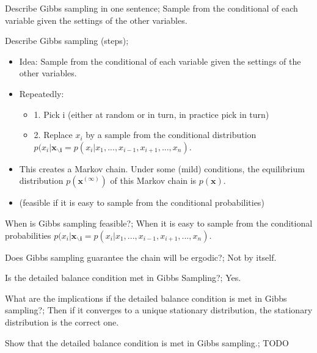\documentclass{article}
\begin{document}
Describe Gibbs sampling in one sentence; Sample from the conditional of each variable given the settings of the other variables.

Describe Gibbs sampling (steps); \begin{itemize}
    \item Idea: Sample from the conditional of each variable given the settings of the other variables.
    \item Repeatedly: \begin{itemize}
        \item 1. Pick i (either at random or in turn, in practice pick in turn)
        \item 2. Replace $x_i$ by a sample from the conditional distribution $p(x_i|\mathbf{x_{\backslash i}} = p(x_i | x_1, ..., x_{i-1}, x_{i+1}, ..., x_n)$.
    \end{itemize}
    \item This creates a Markov chain. Under some (mild) conditions, the equilibrium distribution $p(\mathbf{x}^(\infty))$ of this Markov chain is $p(\mathbf{x})$.
    \item (feasible if it is easy to sample from the conditional probabilities)
\end{itemize}

When is Gibbs sampling feasible?; When it is easy to sample from the conditional probabilities $p(x_i|\mathbf{x_{\backslash i}} = p(x_i | x_1, ..., x_{i-1}, x_{i+1}, ..., x_n)$.

Does Gibbs sampling guarantee the chain will be ergodic?; Not by itself.

Is the detailed balance condition met in Gibbs Sampling?; Yes.

What are the implications if the detailed balance condition is met in Gibbs sampling?; Then if it converges to a unique stationary distribution, the stationary distribution is the correct one.

Show that the detailed balance condition is met in Gibbs sampling.; TODO
\end{document}
